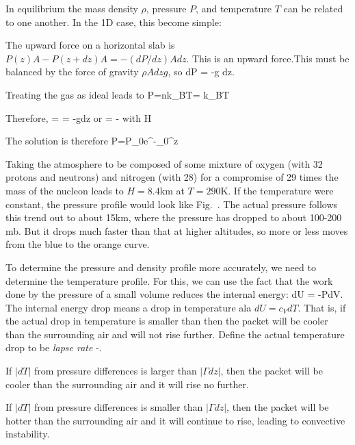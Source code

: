 \documentclass[11pt]{book}
\begin{document}
In equilibrium the mass density $\rho$, pressure $P$, and temperature $T$ can be related to one another. In the 1D case, this become simple:
\bei
\item The upward force on a horizontal slab is $P(z)A-P(z+dz)A=-(dP/dz)A dz$. This is an upward force.This must be balanced by the force of gravity $\rho Adz g$, so
\be
dP = -\rho g dz.
\ee
\item Treating the gas as ideal leads to
\be
P=nk_BT= k_BT\ee
\item Therefore,
\be
{} =  = -gdz\ee
or\be
{} = -
\ee
with \be
H\equiv {}\ee
\item The solution is therefore
\be
P=P_0e^{-\int_0^z }
\ee
\eei

Taking the atmosphere to be composed of some mixture of oxygen (with 32 protons and neutrons) and nitrogen (with 28) for a compromise of 29 times the mass of the nucleon leads to $H=8.4$km at $T=290$K. If the temperature were constant, the pressure profile would look like Fig.~.
The actual pressure follows this trend out to about 15km, where the pressure has dropped to about 100-200 mb. But it drops much faster than that at higher altitudes, so more or less moves from the blue to the orange curve.


To determine the pressure and density profile more accurately, we need to determine the temperature profile. For this, we can use the fact that the work done by the pressure of a small volume reduces the internal energy:
\be
dU = -PdV.
\ee
The internal energy drop means a drop in temperature ala $dU=c_VdT$. That is, if the actual drop in temperature is smaller than then the packet will be cooler than the surrounding air and will not rise further. 
Define the actual temperature drop to be {\it lapse rate}
\be
\Gamma \equiv -.
\ee
\bee
\item If $|dT|$ from pressure differences is larger than $|\Gamma dz|$, then the packet will be cooler than the surrounding air and it will rise no further. 
\item If $|dT|$ from pressure differences is smaller than $|\Gamma dz|$, then the packet will be hotter than the surrounding air and it will continue to rise, leading to convective instability. 
\eee
\end{document}
